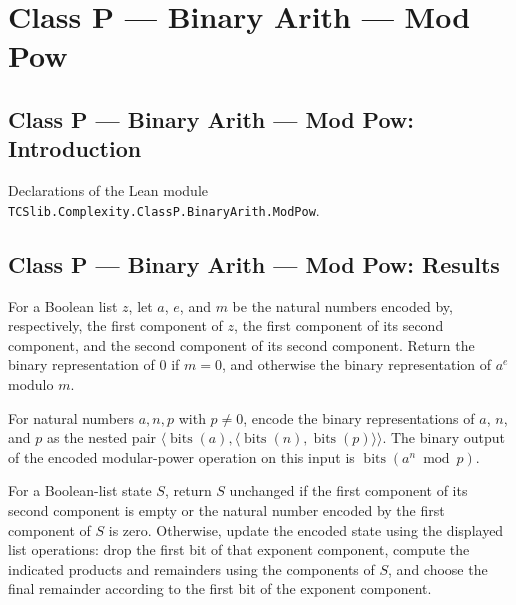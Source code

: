\section{Class P --- Binary Arith --- Mod Pow}
\subsection*{Class P --- Binary Arith --- Mod Pow: Introduction}

Declarations of the Lean module \texttt{TCSlib.Complexity.ClassP.BinaryArith.ModPow}.

\subsection*{Class P --- Binary Arith --- Mod Pow: Results}

\begin{definition}
\label{Complexity.BinArith.powMod}
\leanok
{}
For a Boolean list $z$, let $a$, $e$, and $m$ be the natural numbers encoded by,
respectively, the first component of $z$, the first component of its second component,
and the second component of its second component. Return the binary representation of
$0$ if $m=0$, and otherwise the binary representation of $a^e$ modulo $m$.
\end{definition}

\begin{theorem}
\label{Complexity.BinArith.powMod_pairEncode}
\leanok
{}
For natural numbers $a,n,p$ with $p\neq 0$, encode the binary representations of $a$,
$n$, and $p$ as the nested pair
$\langle\operatorname{bits}(a),\langle\operatorname{bits}(n),\operatorname{bits}(p)\rangle\rangle$.
The binary output of the encoded modular-power operation on this input is
$\operatorname{bits}(a^n\bmod p)$.
\end{theorem}

\begin{definition}
\label{Complexity.BinArith.powStep}
\leanok
{}
For a Boolean-list state $S$, return $S$ unchanged if the first component of its second
component is empty or the natural number encoded by the first component of $S$ is zero.
Otherwise, update the encoded state using the displayed list operations: drop the first
bit of that exponent component, compute the indicated products and remainders using the
components of $S$, and choose the final remainder according to the first bit of the
exponent component.
\end{definition}

